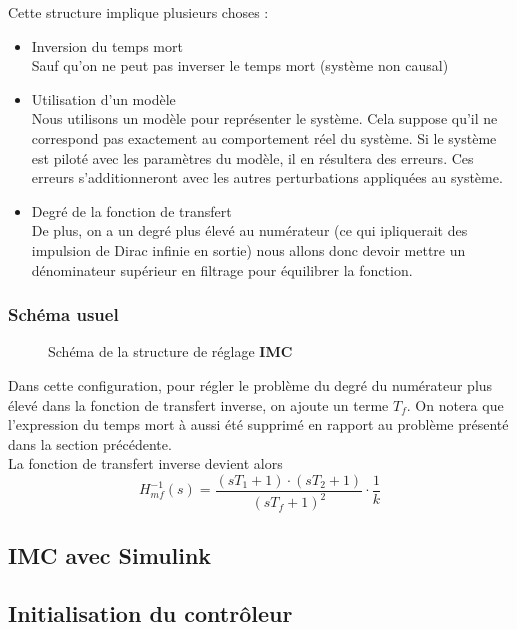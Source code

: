 Cette structure implique plusieurs choses :
\begin{itemize}
\item Inversion du temps mort\\
Sauf qu'on ne peut pas inverser le temps mort (système non causal)

\item Utilisation d'un modèle\\
Nous utilisons un modèle pour représenter le système. Cela suppose qu'il ne correspond pas exactement au comportement réel du système. Si le système est piloté avec les paramètres du modèle, il en résultera des erreurs. Ces erreurs s'additionneront avec les autres perturbations appliquées au système. 
 
\item Degré de la fonction de transfert\\
De plus, on a un degré plus élevé au numérateur (ce qui ipliquerait des impulsion de Dirac infinie en sortie) nous allons donc devoir mettre un dénominateur supérieur en filtrage pour équilibrer la fonction.
\end{itemize}

\subsubsection{Schéma usuel}
\begin{figure}[H]

\caption{Schéma de la structure de réglage \textbf{IMC}}
\end{figure}

Dans cette configuration, pour régler le problème du degré du numérateur plus élevé dans la fonction de transfert inverse, on ajoute un terme $T_{f}$. On notera que l'expression du temps mort à aussi été supprimé en rapport au problème présenté dans la section précédente.\\

La fonction de transfert inverse devient alors 
\begin{equation}
H_{mf}^{-1}(s) = \frac{(sT_{1} + 1) \cdot (sT_{2} + 1)}{(sT_{f} + 1)^{2}} \cdot \frac{1}{k}
\end{equation}

\subsection{IMC avec Simulink}

\subsection{Initialisation du contrôleur}